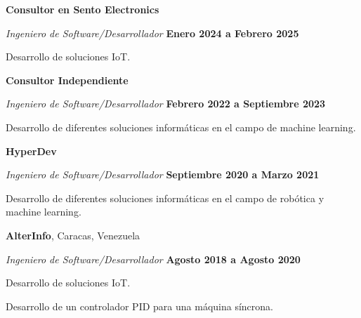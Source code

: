 \documentclass[10pt]{article}
\begin{document}
\textbf{Consultor en Sento Electronics}
\begin{outerlist}
    \item[] \textit{Ingeniero de Software/Desarrollador}
            \hfill \textbf{Enero 2024 a Febrero 2025}
            \begin{innerlist}
                \item Desarrollo de soluciones IoT.
            \end{innerlist}
\end{outerlist}

\textbf{Consultor Independiente}
\begin{outerlist}
    \item[] \textit{Ingeniero de Software/Desarrollador}
            \hfill \textbf{Febrero 2022 a Septiembre 2023}
            \begin{innerlist}
                \item Desarrollo de diferentes soluciones informáticas en el campo de machine learning.
            \end{innerlist}
\end{outerlist}

\textbf{HyperDev}
\begin{outerlist}
    \item[] \textit{Ingeniero de Software/Desarrollador}
            \hfill \textbf{Septiembre 2020 a Marzo 2021}
            \begin{innerlist}
                \item Desarrollo de diferentes soluciones informáticas en el campo de robótica y machine learning.
            \end{innerlist}

\end{outerlist}

\textbf{AlterInfo}, Caracas, Venezuela
\begin{outerlist}
    \item[] \textit{Ingeniero de Software/Desarrollador}%
            \hfill \textbf{Agosto 2018 a Agosto 2020}
            \begin{innerlist}
                \item Desarrollo de soluciones IoT.
                \item Desarrollo de un controlador PID para una máquina síncrona.
            \end{innerlist}
\end{outerlist}
\end{document}
